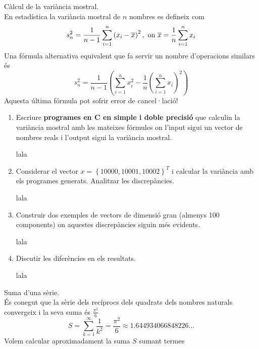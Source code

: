 \documentclass[a4paper, 12pt]{article}
\begin{document}
    \begin{exercici}
        Càlcul de la variància mostral.\\
        En estadística la variància mostral de $n$ nombres es defineix com
        \begin{equation}
            s^2_n = \frac{1}{n-1}\sum\limits_{i=1}^n\left(x_i-\overline{x}\right)^2,\hbox{ on } \overline{x} = \frac{1}{n}\sum\limits_{i=1}^n x_i
            \label{eq:4}
        \end{equation}
        Una fórmula alternativa equivalent que fa servir un nombre d'operacions similars és
        \begin{equation}
            s^2_n = \frac{1}{n-1}\left(\sum\limits_{i=1}^{n} x^2_i - \frac{1}{n}\left(\sum\limits_{i=1}^{n}x_i\right)^2\right)
            \label{eq:5}
        \end{equation}
        Aquesta última fórmula pot sofrir error de cancel·lació!
        \begin{enumerate}[label=\alph*)]
            \item Escriure \textbf{programes en C en simple i doble precisió} que calculin la
            variància mostral amb les mateixes fórmules on l'input sigui un vector de nombres reals
            i l'output sigui la variància mostral.\\
            \begin{solucio}
                lala
            \end{solucio}
            \item Considerar el vector $x = \left\{10000, 10001, 10002\right\}^T$ i calcular la
            variància amb els programes generats. Analitzar les discrepàncies.\\
            \begin{solucio}
                lala
            \end{solucio}
            \item Construir dos exemples de vectors de dimensió gran (almenys 100 components) on
            aquestes discrepàncies siguin més evidents.\\
            \begin{solucio}
                lala
            \end{solucio}
            \item Discutir les diferències en els resultats.\\
            \begin{solucio}
                lala
            \end{solucio}
        \end{enumerate}
    \end{exercici}
    \begin{exercici}
        Suma d'una sèrie.\\
        És conegut que la sèrie dels recíprocs dels quadrats dels nombres naturals convergeix i la
        seva suma és $\frac{\pi^2}{6}$
        \begin{equation}
            S = \sum\limits_{k=1}^\infty\frac{1}{k^2} = \frac{\pi^2}{6} \approx 1.644934066848226\dots
            \label{eq:6}
        \end{equation}
        Volem calcular aproximadament la suma $S$ sumant termes 
    \end{exercici}
\end{document}
